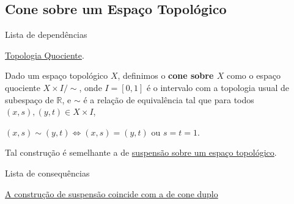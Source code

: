 \subsection{Cone sobre um Espaço Topológico}
\label{cone-def}
\begin{titlemize}{Lista de dependências}
	\item \hyperref[topologia-quociente-def]{Topologia Quociente}.
\end{titlemize}

\begin{defi}[Cone]
    Dado um espaço topológico $X$, definimos o \textbf{cone sobre $X$} como o espaço quociente $X\times I/\sim$,
    onde $I=[0,1]$ é o intervalo com a topologia usual de subespaço de $\mathbb{R}$, e $\sim$ é a relação de equivalência tal que para todos $(x,s),(y,t) \in X\times I$,\\
    \centerline{
    $(x,s)\sim(y,t) \Leftrightarrow (x,s)=(y,t)$ ou $s=t=1$.}
\end{defi}

Tal construção é semelhante a de \hyperref[suspensao-def]{suspensão sobre um espaço topológico}.

\begin{titlemize}{Lista de consequências}
    \item \hyperref[suspensao-cone-duplo-prop]{A construção de suspensão coincide com a de cone duplo}
\end{titlemize}